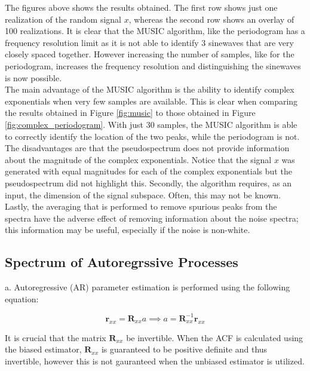 \noindent{}The figures above shows the results obtained. The first row shows just one realization of the random signal $x$, whereas the second row shows an overlay of 100 realizations. It is clear that the MUSIC algorithm, like the periodogram has a frequency resolution limit as it is not able to identify 3 sinewaves that are very closely spaced together. However increasing the number of samples, like for the periodogram, increases the frequency resolution and distinguishing the sinewaves is now possible.\\

\noindent{}The main advantage of the MUSIC algorithm is the ability to identify complex exponentials when very few samples are available. This is clear when comparing the results obtained in Figure \ref{fig:music} to those obtained in Figure \ref{fig:complex_periodogram}. With just 30 samples, the MUSIC algorithm is able to correctly identify the location of the two peaks, while the periodogram is not.\\

\noindent{}The disadvantages are that the pseudospectrum does not provide information about the magnitude of the complex exponentials. Notice that the signal $x$ was generated with equal magnitudes for each of the complex exponentials but the pseudospectrum did not highlight this. Secondly, the algorithm requires, as an input, the dimension of the signal subspace. Often, this may not be known. Lastly, the averaging that is performed to remove spurious peaks from the spectra have the adverse effect of removing information about the noise spectra; this information may be useful, especially if the noise is non-white.

\newpage
\subsection{Spectrum of Autoregrssive Processes}

\noindent{}a. Autoregressive (AR) parameter estimation is performed using the following equation:

\begin{equation*}
\textbf{r}_{xx} = \textbf{R}_{xx}a \implies a = \textbf{R}_{xx}^{-1}\textbf{r}_{xx}
\end{equation*}

\noindent{}It is crucial that the matrix $\textbf{R}_{xx}$ be invertible. When the ACF is calculated using the biased estimator, $\textbf{R}_{xx}$ is guaranteed to be positive definite and thus invertible, however this is not gauranteed when the unbiased estimator is utilized.\\

